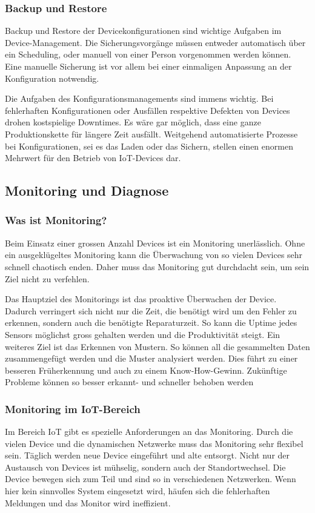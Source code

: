\subsubsection{Backup und Restore} Backup und Restore der Devicekonfigurationen sind wichtige Aufgaben im Device-Management. Die Sicherungsvorgänge müssen entweder automatisch über ein Scheduling, oder manuell von einer Person vorgenommen werden können. Eine manuelle Sicherung ist vor allem bei einer einmaligen Anpassung an der Konfiguration notwendig. 

Die Aufgaben des Konfigurationsmanagements sind immens wichtig. Bei fehlerhaften Konfigurationen oder Ausfällen respektive Defekten von Devices drohen kostspielige Downtimes. Es wäre gar möglich, dass eine ganze Produktionskette für längere Zeit ausfällt. Weitgehend automatisierte Prozesse bei Konfigurationen, sei es das Laden oder das Sichern, stellen einen enormen Mehrwert für den Betrieb von IoT-Devices dar.

\subsection{Monitoring und Diagnose}
\subsubsection{Was ist Monitoring?}
Beim Einsatz einer grossen Anzahl Devices ist ein Monitoring unerlässlich. Ohne ein ausgeklügeltes Monitoring kann die Überwachung von so vielen Devices sehr schnell chaotisch enden. Daher muss das Monitoring gut durchdacht sein, um sein Ziel nicht zu verfehlen. 

Das Hauptziel des Monitorings ist das proaktive Überwachen der Device. Dadurch verringert sich nicht nur die Zeit, die benötigt wird um den Fehler zu erkennen, sondern auch die benötigte Reparaturzeit. So kann die Uptime jedes Sensors möglichst gross gehalten werden und die Produktivität steigt. Ein weiteres Ziel ist das Erkennen von Mustern. So können all die gesammelten Daten zusammengefügt werden und die Muster analysiert werden. Dies führt zu einer besseren Früherkennung und auch zu einem Know-How-Gewinn.  Zukünftige Probleme können so besser erkannt- und schneller behoben werden
\cite{MonZiele}

\subsubsection{Monitoring im IoT-Bereich}
Im Bereich IoT gibt es spezielle Anforderungen an das Monitoring. Durch die vielen Device und die dynamischen Netzwerke muss das Monitoring sehr flexibel sein. Täglich werden neue Device eingeführt und alte entsorgt. Nicht nur der Austausch von Devices ist mühselig, sondern auch der Standortwechsel. Die Device bewegen sich zum Teil und sind so in verschiedenen Netzwerken. Wenn hier kein sinnvolles System eingesetzt wird, häufen sich die fehlerhaften Meldungen und das Monitor wird ineffizient.

